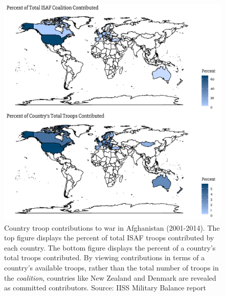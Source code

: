 \documentclass[12pt,letterpaper]{article}
\begin{document}
		\begin{figure}
			\centering
			\includegraphics[scale=0.85]{figures/contr_map_both.pdf}
			\caption{Country troop contributions to war in Afghanistan (2001-2014). The top figure displays the percent of total ISAF troops contributed by each country. The bottom figure displays the percent of a country's total troops contributed. By viewing contributions in terms of a country's available troops, rather than the total number of troops in the \emph{coalition}, countries like New Zealand and Denmark are revealed as committed contributors. Source: IISS Military Balance report}
			\label{fig:contrib_map}
		\end{figure}
	
\end{document}
